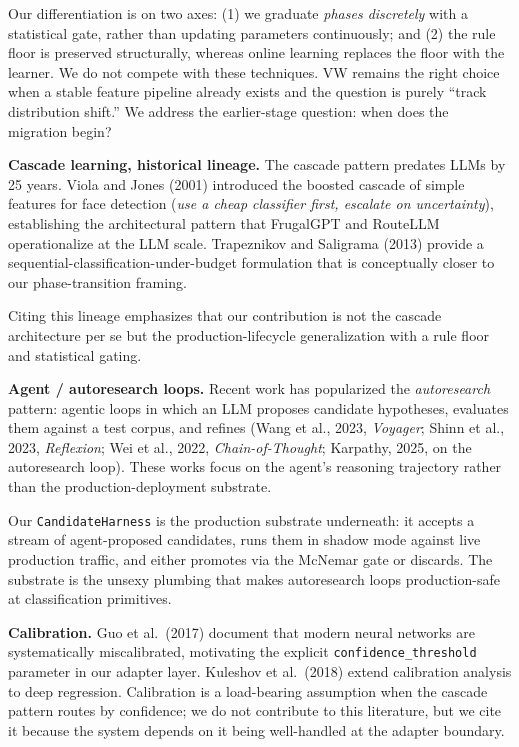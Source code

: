 Our differentiation is on two axes: (1) we graduate \emph{phases
discretely} with a statistical gate, rather than updating parameters
continuously; and (2) the rule floor is preserved structurally, whereas
online learning replaces the floor with the learner. We do not compete
with these techniques. VW remains the right choice when a stable feature
pipeline already exists and the question is purely ``track distribution
shift.'' We address the earlier-stage question: when does the migration
begin?

\textbf{Cascade learning, historical lineage.} The cascade pattern
predates LLMs by 25 years. Viola and Jones (2001) introduced the boosted
cascade of simple features for face detection (\emph{use a cheap
classifier first, escalate on uncertainty}), establishing the
architectural pattern that FrugalGPT and RouteLLM operationalize at the
LLM scale. Trapeznikov and Saligrama (2013) provide a
sequential-classification-under-budget formulation that is conceptually
closer to our phase-transition framing.

Citing this lineage emphasizes that our contribution is not the cascade
architecture per se but the production-lifecycle generalization with a
rule floor and statistical gating.

\textbf{Agent / autoresearch loops.} Recent work has popularized the
\emph{autoresearch} pattern: agentic loops in which an LLM proposes
candidate hypotheses, evaluates them against a test corpus, and refines
(Wang et al., 2023, \emph{Voyager}; Shinn et al., 2023,
\emph{Reflexion}; Wei et al., 2022, \emph{Chain-of-Thought}; Karpathy,
2025, on the autoresearch loop). These works focus on the agent's
reasoning trajectory rather than the production-deployment substrate.

Our \texttt{CandidateHarness} is the production substrate underneath: it
accepts a stream of agent-proposed candidates, runs them in shadow mode
against live production traffic, and either promotes via the McNemar
gate or discards. The substrate is the unsexy plumbing that makes
autoresearch loops production-safe at classification primitives.

\textbf{Calibration.} Guo et al.~(2017) document that modern neural
networks are systematically miscalibrated, motivating the explicit
\texttt{confidence\_threshold} parameter in our adapter layer. Kuleshov
et al.~(2018) extend calibration analysis to deep regression.
Calibration is a load-bearing assumption when the cascade pattern routes
by confidence; we do not contribute to this literature, but we cite it
because the system depends on it being well-handled at the adapter
boundary.

